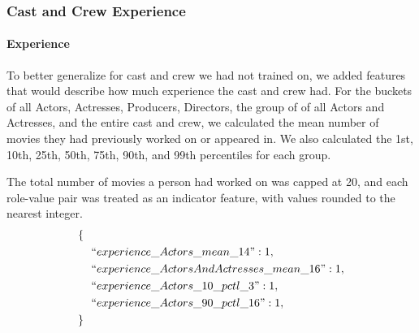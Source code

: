 \documentclass[journal]{IEEEtran}
\begin{document}
\subsubsection{Cast and Crew Experience}
\paragraph{Experience}

To better generalize for cast and crew we had not trained on, we added features that would describe how much experience the cast and crew had.  For the buckets of all Actors, Actresses, Producers, Directors, the group of of all Actors and Actresses, and the entire cast and crew, we calculated the mean number of movies they had previously worked on or appeared in.  We also calculated the 1st, 10th, 25th, 50th, 75th, 90th, and 99th percentiles for each group.
\begin{center}
\end{center}

The total number of movies a person had worked on was capped at 20, and each role-value pair was treated as an indicator feature, with values rounded to the nearest integer.
\begin{align*}
        \{\ \ &\\
        &``experience\_Actors\_mean\_14": 1,\\
        &``experience\_ActorsAndActresses\_mean\_16": 1,\\
        &``experience\_Actors\_10\_pctl\_3": 1,\\
        &``experience\_Actors\_90\_pctl\_16": 1,\\
        \}\ \ &
\end{align*}
\end{document}
